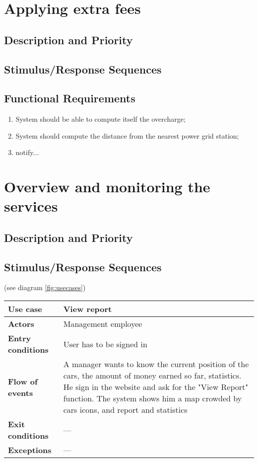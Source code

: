 \documentclass{scrreprt}
\begin{document}
\section{Applying extra fees}
\subsection{Description and Priority}

\subsection{Stimulus/Response Sequences}

\subsection{Functional Requirements}
\begin{enumerate}[label=R\arabic*.,resume]
\item System should be able to compute itself the overcharge;
\item System should compute the distance from the nearest power grid station;
\item notify...
\end{enumerate}

\section{Overview and monitoring the services}
\subsection{Description and Priority}

\subsection{Stimulus/Response Sequences}
(see diagram \vref{fig:usecases})

\begin{center}
\begin{tabularx}{\columnwidth}{>{\bfseries}lX}
\toprule
Use case & View report\\
\midrule
Actors & Management employee\\
\midrule
Entry conditions & User has to be signed in\\
\midrule
Flow of events & A manager wants to know the current position of the cars, the amount of money earned so far, statistics. He sign in the website and ask for the "View Report" function. The system shows him a map crowded by cars icons, and report and statistics\\
\midrule
Exit conditions & ---\\
\midrule
Exceptions & ---\\
\bottomrule
\end{tabularx}
\end{center}
\end{document}
